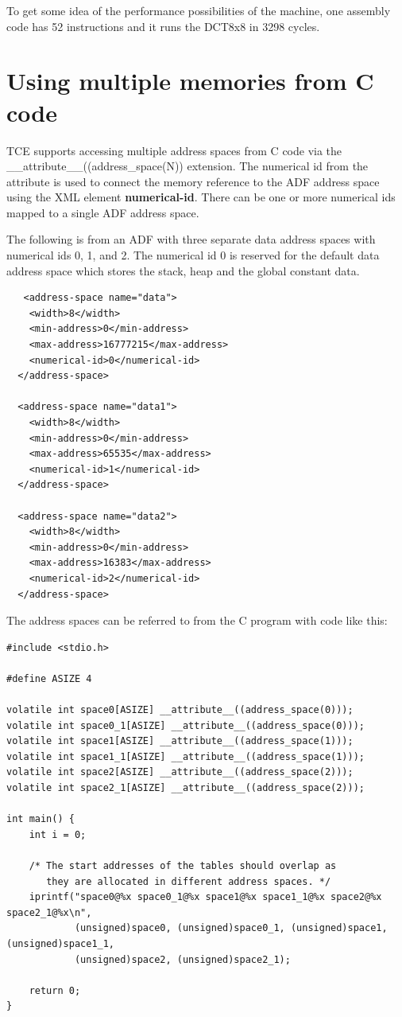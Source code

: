 \documentclass[twoside]{tceusermanual}
\begin{document}
To get some idea of the performance possibilities of the machine,
one assembly code has 52 instructions and it runs the DCT8x8 in
3298 cycles.

\section{Using multiple memories from C code}

TCE supports accessing multiple address spaces from C code via the
\_\_attribute\_\_((address\_space(N)) extension. The numerical id from
the attribute is used to connect the memory reference to the ADF 
address space using the XML element \textbf{numerical-id}. There can be
one or more numerical ids mapped to a single ADF address space.

The following is from an ADF with three separate data address spaces with
numerical ids 0, 1, and 2. The numerical id 0 is reserved for the default 
data address space which stores the stack, heap and the global constant 
data.

\begin{verbatim}
   <address-space name="data">
    <width>8</width>
    <min-address>0</min-address>
    <max-address>16777215</max-address>
    <numerical-id>0</numerical-id>
  </address-space>

  <address-space name="data1">
    <width>8</width>
    <min-address>0</min-address>
    <max-address>65535</max-address>
    <numerical-id>1</numerical-id>
  </address-space>

  <address-space name="data2">
    <width>8</width>
    <min-address>0</min-address>
    <max-address>16383</max-address>
    <numerical-id>2</numerical-id>
  </address-space>
\end{verbatim}

The address spaces can be referred to from the C program with code
like this:

\begin{verbatim}
#include <stdio.h>

#define ASIZE 4

volatile int space0[ASIZE] __attribute__((address_space(0)));
volatile int space0_1[ASIZE] __attribute__((address_space(0)));
volatile int space1[ASIZE] __attribute__((address_space(1)));
volatile int space1_1[ASIZE] __attribute__((address_space(1)));
volatile int space2[ASIZE] __attribute__((address_space(2)));
volatile int space2_1[ASIZE] __attribute__((address_space(2)));

int main() {
    int i = 0;

    /* The start addresses of the tables should overlap as
       they are allocated in different address spaces. */
    iprintf("space0@%x space0_1@%x space1@%x space1_1@%x space2@%x space2_1@%x\n",
            (unsigned)space0, (unsigned)space0_1, (unsigned)space1, (unsigned)space1_1,
            (unsigned)space2, (unsigned)space2_1);

    return 0;
}
\end{verbatim}
\end{document}
